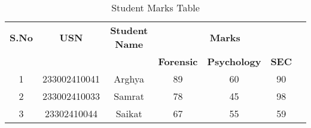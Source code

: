 \documentclass{article}
\begin{document}
\begin{table}[h]
\centering
\begin{tabular}{|c|c|c|c|c|c|c|}
\hline
\textbf{S.No} & \textbf{USN} & \textbf{Student Name} & \multicolumn{3}{c|}{\textbf{Marks}} \\ \cline{4-6}
              &              &                       & \textbf{Forensic} & \textbf{Psychology} & \textbf{SEC} \\ \hline
1             & 233002410041   & Arghya                 & 89                & 60                & 90                \\ \hline
2             & 233002410033   & Samrat                 & 78                & 45                & 98                \\ \hline
3             & 23302410044   & Saikat                 & 67                & 55                & 59                \\ \hline
\end{tabular}
\caption{Student Marks Table}
\end{table}
\end{document}
